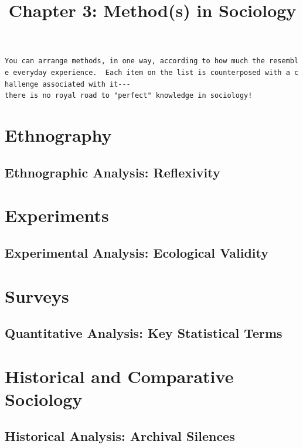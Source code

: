 \documentclass[
  letterpaper,
  DIV=11,
  numbers=noendperiod,
  oneside]{scrartcl}
\title{Chapter 3: Method(s) in Sociology}
\author{}
\date{}
\begin{document}
\maketitle


\texttt{You\ can\ arrange\ methods,\ in\ one\ way,\ according\ to\ how\ much\ the\ resemble\ everyday\ experience.\ \ Each\ item\ on\ the\ list\ is\ counterposed\ with\ a\ challenge\ associated\ with\ it-\/-\/-there\ is\ no\ royal\ road\ to\ "perfect"\ knowledge\ in\ sociology!}

\section{Ethnography}\label{ethnography}

\subsection{Ethnographic Analysis:
Reflexivity}\label{ethnographic-analysis-reflexivity}

\section{Experiments}\label{experiments}

\subsection{Experimental Analysis: Ecological
Validity}\label{experimental-analysis-ecological-validity}

\section{Surveys}\label{surveys}

\subsection{Quantitative Analysis: Key Statistical
Terms}\label{quantitative-analysis-key-statistical-terms}

\section{Historical and Comparative
Sociology}\label{historical-and-comparative-sociology}

\subsection{Historical Analysis: Archival
Silences}\label{historical-analysis-archival-silences}
\end{document}
